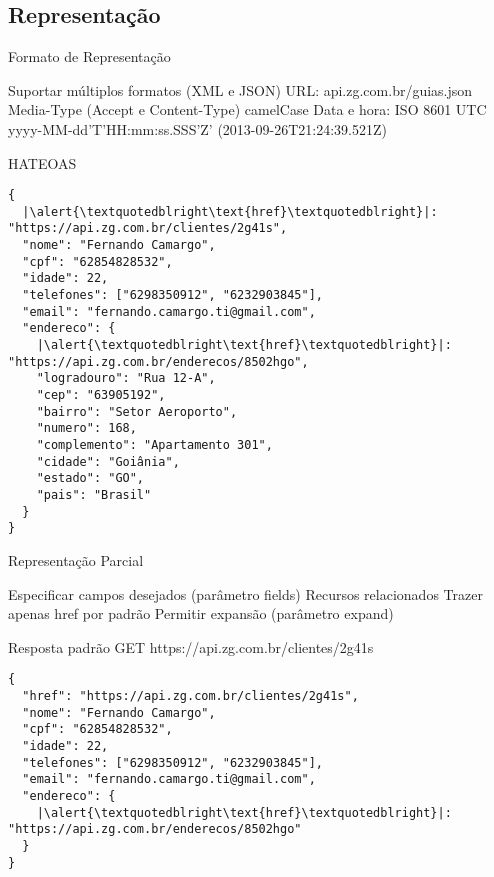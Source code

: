 \documentclass{beamer}
\begin{document}
\subsection{Representação}

\begin{frame}{Formato de Representação}
  \begin{outline}
     Suportar múltiplos formatos (XML e JSON)
       URL: api.zg.com.br/guias\alert{.json}
       Media-Type (Accept e Content-Type)
     camelCase
     Data e hora: ISO 8601
       UTC
       yyyy-MM-dd'T'HH:mm:ss.SSS'Z' (\alert{2013-09-26}T\alert{21:24:39.521}Z)
  \end{outline}
\end{frame}

\begin{frame}[fragile]{HATEOAS}
  \begin{verbatim}
{
  |\alert{\textquotedblright\text{href}\textquotedblright}|: "https://api.zg.com.br/clientes/2g41s",
  "nome": "Fernando Camargo",
  "cpf": "62854828532",
  "idade": 22,
  "telefones": ["6298350912", "6232903845"],
  "email": "fernando.camargo.ti@gmail.com",
  "endereco": {
    |\alert{\textquotedblright\text{href}\textquotedblright}|: "https://api.zg.com.br/enderecos/8502hgo",
    "logradouro": "Rua 12-A",
    "cep": "63905192",
    "bairro": "Setor Aeroporto",
    "numero": 168,
    "complemento": "Apartamento 301",
    "cidade": "Goiânia",
    "estado": "GO",
    "pais": "Brasil"
  }
}
  \end{verbatim}
\end{frame}

\begin{frame}{Representação Parcial}
  \begin{outline}
     Especificar campos desejados (parâmetro \alert{fields})
     Recursos relacionados
       Trazer apenas \alert{href} por padrão
       Permitir expansão (parâmetro \alert{expand})
  \end{outline}
\end{frame}

\begin{frame}[fragile]{Resposta padrão}
  GET https://api.zg.com.br/clientes/2g41s
  \begin{verbatim}
{
  "href": "https://api.zg.com.br/clientes/2g41s",
  "nome": "Fernando Camargo",
  "cpf": "62854828532",
  "idade": 22,
  "telefones": ["6298350912", "6232903845"],
  "email": "fernando.camargo.ti@gmail.com",
  "endereco": {
    |\alert{\textquotedblright\text{href}\textquotedblright}|: "https://api.zg.com.br/enderecos/8502hgo"
  }
}
  \end{verbatim}
\end{frame}
\end{document}
